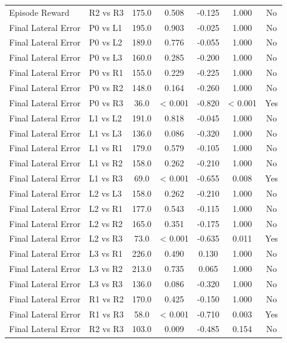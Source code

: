 \begin{table}[t]
\begin{tabular}{l l c c c c c}
Episode Reward & R2 vs R3 & 175.0 & 0.508 & -0.125 & 1.000 & No \\
Final Lateral Error & P0 vs L1 & 195.0 & 0.903 & -0.025 & 1.000 & No \\
Final Lateral Error & P0 vs L2 & 189.0 & 0.776 & -0.055 & 1.000 & No \\
Final Lateral Error & P0 vs L3 & 160.0 & 0.285 & -0.200 & 1.000 & No \\
Final Lateral Error & P0 vs R1 & 155.0 & 0.229 & -0.225 & 1.000 & No \\
Final Lateral Error & P0 vs R2 & 148.0 & 0.164 & -0.260 & 1.000 & No \\
Final Lateral Error & P0 vs R3 & 36.0 & < 0.001 & -0.820 & < 0.001 & Yes \\
Final Lateral Error & L1 vs L2 & 191.0 & 0.818 & -0.045 & 1.000 & No \\
Final Lateral Error & L1 vs L3 & 136.0 & 0.086 & -0.320 & 1.000 & No \\
Final Lateral Error & L1 vs R1 & 179.0 & 0.579 & -0.105 & 1.000 & No \\
Final Lateral Error & L1 vs R2 & 158.0 & 0.262 & -0.210 & 1.000 & No \\
Final Lateral Error & L1 vs R3 & 69.0 & < 0.001 & -0.655 & 0.008 & Yes \\
Final Lateral Error & L2 vs L3 & 158.0 & 0.262 & -0.210 & 1.000 & No \\
Final Lateral Error & L2 vs R1 & 177.0 & 0.543 & -0.115 & 1.000 & No \\
Final Lateral Error & L2 vs R2 & 165.0 & 0.351 & -0.175 & 1.000 & No \\
Final Lateral Error & L2 vs R3 & 73.0 & < 0.001 & -0.635 & 0.011 & Yes \\
Final Lateral Error & L3 vs R1 & 226.0 & 0.490 & 0.130 & 1.000 & No \\
Final Lateral Error & L3 vs R2 & 213.0 & 0.735 & 0.065 & 1.000 & No \\
Final Lateral Error & L3 vs R3 & 136.0 & 0.086 & -0.320 & 1.000 & No \\
Final Lateral Error & R1 vs R2 & 170.0 & 0.425 & -0.150 & 1.000 & No \\
Final Lateral Error & R1 vs R3 & 58.0 & < 0.001 & -0.710 & 0.003 & Yes \\
Final Lateral Error & R2 vs R3 & 103.0 & 0.009 & -0.485 & 0.154 & No \\
\hline
\end{tabular}
\end{table}
